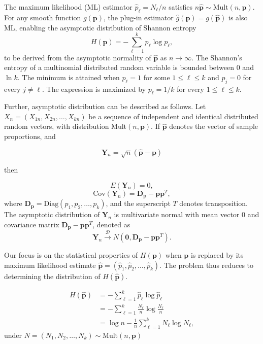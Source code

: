 The maximum likelihood (ML) estimator $\widehat{p}_\ell = N_\ell / n$ satisfies $n\widehat{\mathbf{p}} \sim \mathrm{Mult}(n,\mathbf{p})$. For any smooth function $g(\mathbf{p})$, the plug-in estimator $\widehat{g}(\mathbf{p}) = g(\widehat{\mathbf{p}})$ is also ML, enabling the asymptotic distribution of Shannon entropy
\begin{equation}
	H(\mathbf{p}) = -\sum_{\ell=1}^k p_\ell \log p_\ell,
	\label{eq:AsymEntropy}
\end{equation}
to be derived from the asymptotic normality of $\widehat{\mathbf{p}}$ as $n \to \infty$.
The Shannon's entropy of a multinomial distributed random variable is bounded between 0 and $\ln k$. The minimum is attained when $p_{\ell}=1$ for some $1\leq \ell \leq k$ and $p_j=0$ for every $j\ne \ell$. The expression is maximized by $p_{\ell}=1/k$ for every $1\leq \ell \leq k$.  

Further, asymptotic distribution can be described as follows. Let $X_n=(X_{1n},X_{2n},\dots,X_{kn})$ be a sequence of independent and identical distributed random vectors, with distribution $\text{Mult}(n,\mathbf{p})$. If $\widehat{\mathbf{p}}$ denotes the vector of sample proportions, and 

\[\mathbf{Y}_n=\sqrt{n}(\widehat{\mathbf{p}}-\mathbf{p})\] 

then

\[E(\mathbf{Y}_n)=0,\]
\[\text{Cov}(\mathbf{Y}_n)=\mathbf{D_p}-\mathbf{pp}^T,\]
where $\mathbf{D_p}=\text{Diag}(p_1,p_2,\dots,p_k)$, and the superscript $T$ denotes transposition. The asymptotic distribution of $\mathbf{Y}_n$ is multivariate normal with mean vector $0$ and covariance matrix $\mathbf{D_p}-\mathbf{pp}^T$, denoted as
%
\begin{equation}
	\mathbf{Y}_n \xrightarrow{\mathscr{D}} N(\mathbf{0}, \mathbf{D_p}-\mathbf{pp}^T).
	\label{eq:Cov} 
\end{equation}
 
Our focus is on the statistical properties of $H(\mathbf{p})$ when $\mathbf{p}$ is replaced by its maximum likelihood estimate $\widehat{\mathbf{p}} = (\widehat{p}_1, \widehat{p}_2, \dots, \widehat{p}_k)$. The problem thus reduces to determining the distribution of $H(\widehat{\mathbf{p}})$.

\begin{align}
	H(\widehat{\mathbf{p}})
	&= -\sum_{\ell=1}^k \widehat{p}_\ell \log \widehat{p}_\ell \nonumber \\
	&= -\sum_{\ell=1}^k \frac{N_\ell}{n} \log \frac{N_\ell}{n} \nonumber \\
	&= \log n - \frac{1}{n} \sum_{\ell=1}^k N_\ell \log N_\ell,
\end{align}
under $N=(N_1,N_2,\dots,N_k)\sim \text{Mult}(n,\mathbf{p})$

